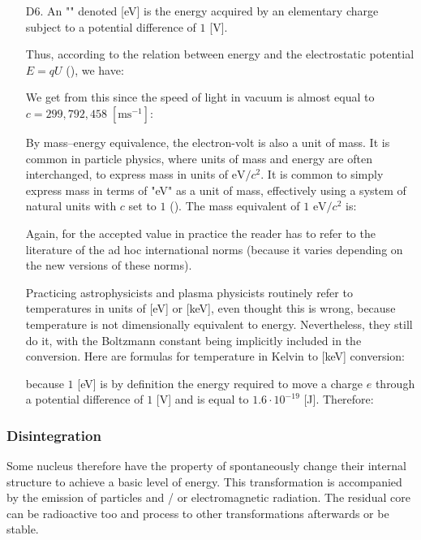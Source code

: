 \begin{enumerate}
	  \item[D6.] An "\label{electron volt}" denoted [eV] is the energy acquired by an elementary charge subject to a potential difference of $1$ [V].
	  
	  Thus, according to the relation between energy and the electrostatic potential $E=qU$ (), we have:
	
	We get from this since the speed of light in vacuum is almost equal to $c=299,792,458\;[\text{ms}^{-1}]$:
	
	  
	 By mass–energy equivalence, the electron-volt is also a unit of mass. It is common in particle physics, where units of mass and energy are often interchanged, to express mass in units of $\text{eV}/c^2$. It is common to simply express mass in terms of "eV" as a unit of mass, effectively using a system of natural units with $c$ set to $1$ (). The mass equivalent of $1$ $\text{eV}/c^2$ is:
	
	Again, for the accepted value in practice the reader has to refer to the literature of the ad hoc international norms (because it varies depending on the new versions of these norms).
	\begin{tcolorbox}[title=Remark,colframe=black,arc=10pt]
	Practicing astrophysicists and plasma physicists routinely refer to temperatures in units of [eV] or [keV], even thought this is wrong, because temperature is not dimensionally equivalent to energy. Nevertheless, they still do it, with the Boltzmann constant being implicitly included in the conversion. Here are formulas for temperature in Kelvin to [keV] conversion:
	
	because $1$ [eV] is by definition the energy required to move a charge $e$ through a potential difference of $1$ [V] and is equal to $1.6\cdot 10^{-19}$ [J]. Therefore:
	
	\end{tcolorbox}
	\end{enumerate}
	
	\pagebreak
	\subsubsection{Disintegration}
	Some nucleus therefore have the property of spontaneously change their internal structure to achieve a basic level of energy. This transformation is accompanied by the emission of particles and / or electromagnetic radiation. The residual core can be radioactive too and process to other transformations afterwards or be stable.

